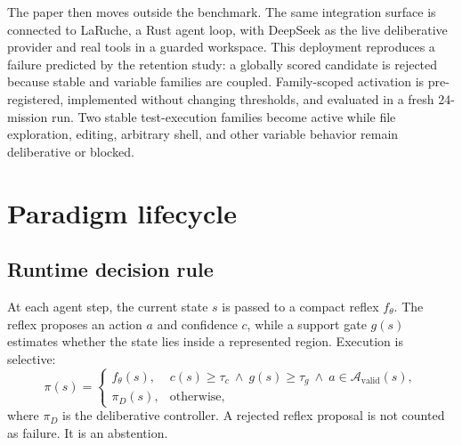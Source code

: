 \documentclass[10pt]{article}
\begin{document}
The paper then moves outside the benchmark. The same integration surface is connected to LaRuche, a Rust agent loop, with DeepSeek as the live deliberative provider and real tools in a guarded workspace. This deployment reproduces a failure predicted by the retention study: a globally scored candidate is rejected because stable and variable families are coupled. Family-scoped activation is pre-registered, implemented without changing thresholds, and evaluated in a fresh 24-mission run. Two stable test-execution families become active while file exploration, editing, arbitrary shell, and other variable behavior remain deliberative or blocked.

\section{Paradigm lifecycle}

\subsection{Runtime decision rule}

At each agent step, the current state $s$ is passed to a compact reflex $f_\theta$. The reflex proposes an action $a$ and confidence $c$, while a support gate $g(s)$ estimates whether the state lies inside a represented region. Execution is selective:
\begin{equation}
\pi(s)=
\begin{cases}
 f_\theta(s), & c(s)\ge \tau_c \ \wedge\ g(s)\ge \tau_g \ \wedge\ a\in\mathcal{A}_{\mathrm{valid}}(s),\\
 \pi_D(s), & \text{otherwise},
\end{cases}
\end{equation}
where $\pi_D$ is the deliberative controller. A rejected reflex proposal is not counted as failure. It is an abstention.
\end{document}
